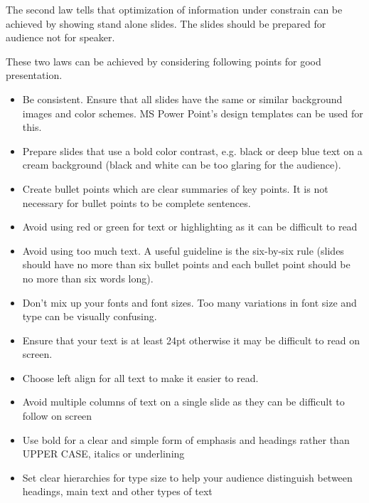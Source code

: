 The second law tells that optimization of information under constrain can be achieved by showing stand alone slides. The slides should be prepared  for audience not for speaker.



These two laws can be achieved by considering following points for good presentation.\cite {Stephen Moffat}

\begin{itemize}
  \item Be consistent. Ensure that all slides have the same or similar background images and color schemes. MS Power Point's design templates can be used for this.
  \item Prepare slides that use a bold color contrast, e.g. black or deep blue text on a cream background (black and white can be too glaring for the audience).
  \item Create bullet points which are clear summaries of key points. It is not necessary for bullet points to be complete sentences.
  \item Avoid using red or green for text or highlighting as it can be difficult to read
  \item Avoid using too much text. A useful guideline is the six-by-six rule (slides should have no more than six bullet points and each bullet point should be no more than six words long).
  \item Don't mix up your fonts and font sizes. Too many variations in font size and type can be visually confusing.
  \item Ensure that your text is at least 24pt otherwise it may be difficult to read on screen.
 \item Choose left align for all text to make it easier to read.
 \item Avoid multiple columns of text on a single slide as they can be difficult to follow on screen
 \item Use bold for a clear and simple form of emphasis and headings rather than UPPER CASE, italics or underlining
\item Set clear hierarchies for type size to help your audience distinguish between headings, main text and other types of text
\end{itemize}








